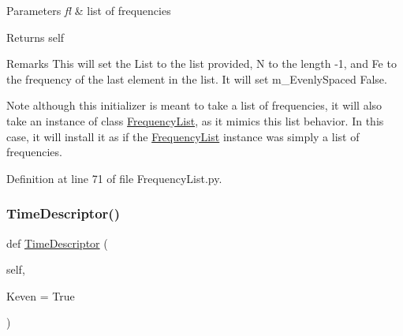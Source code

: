 \begin{DoxyParams}{Parameters}
{\em fl} & list of frequencies \\
\hline
\end{DoxyParams}
\begin{DoxyReturn}{Returns}
self 
\end{DoxyReturn}
\begin{DoxyRemark}{Remarks}
This will set the List to the list provided, N to the length -\/1, and Fe to the frequency of the last element in the list. It will set m\+\_\+\+Evenly\+Spaced False. 
\end{DoxyRemark}
\begin{DoxyNote}{Note}
although this initializer is meant to take a list of frequencies, it will also take an instance of class \hyperlink{classSignalIntegrity_1_1FrequencyDomain_1_1FrequencyList_1_1FrequencyList}{Frequency\+List}, as it mimics this list behavior. In this case, it will install it as if the \hyperlink{classSignalIntegrity_1_1FrequencyDomain_1_1FrequencyList_1_1FrequencyList}{Frequency\+List} instance was simply a list of frequencies. 
\end{DoxyNote}


Definition at line 71 of file Frequency\+List.\+py.

\mbox{\label{classSignalIntegrity_1_1FrequencyDomain_1_1FrequencyList_1_1FrequencyList_ae0cb8207edfbc631f1af2fc543e3d4d7}} 
\subsubsection{\texorpdfstring{Time\+Descriptor()}{TimeDescriptor()}}
{\footnotesize\ttfamily def \hyperlink{classSignalIntegrity_1_1TimeDomain_1_1Waveform_1_1TimeDescriptor_1_1TimeDescriptor}{Time\+Descriptor} (\begin{DoxyParamCaption}\item[{}]{self,  }\item[{}]{Keven = {\ttfamily True} }\end{DoxyParamCaption})}



